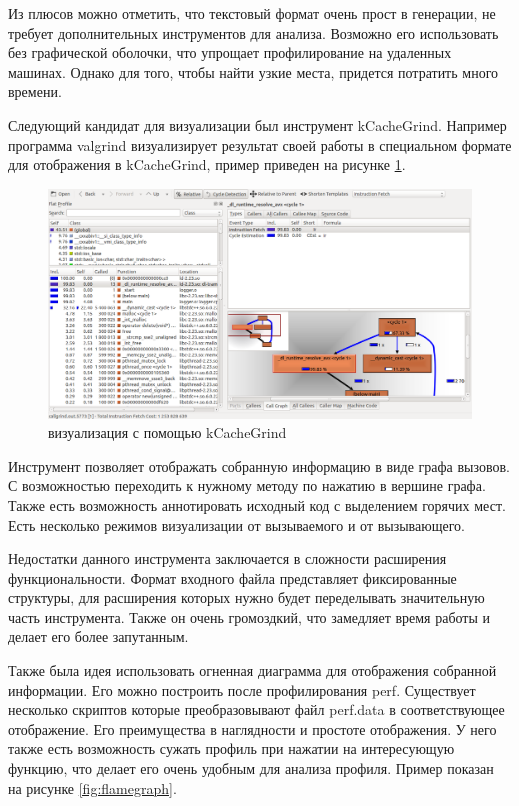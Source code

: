     Из плюсов можно отметить, что текстовый формат очень прост в генерации, не требует дополнительных инструментов для анализа. Возможно его использовать без графической оболочки, что упрощает профилирование на удаленных машинах. Однако для того, чтобы найти узкие места, придется потратить много времени.
    
    Следующий кандидат для визуализации был инструмент kCacheGrind. Например программа valgrind визуализирует результат своей работы в специальном формате для отображения в kCacheGrind, пример приведен на рисунке \ref{fig:kCacheGrind}.
    
    \begin{figure}[H]
        \caption{визуализация с помощью kCacheGrind}
        \label{fig:kCacheGrind}
        \centering
        \includegraphics[scale=0.3]{images/kCacheGrind}
    \end{figure}
    
    Инструмент позволяет отображать собранную информацию в виде графа вызовов. С возможностью переходить к нужному методу по нажатию в вершине графа. Также есть возможность аннотировать исходный код с выделением горячих мест. Есть несколько режимов визуализации от вызываемого и от вызывающего.
    
    Недостатки данного инструмента заключается в сложности расширения функциональности. Формат входного файла представляет фиксированные структуры, для расширения которых нужно будет переделывать значительную часть инструмента. Также он очень громоздкий, что замедляет время работы и делает его более запутанным.
    
    Также была идея использовать огненная диаграмма \cite{flamegraph} для отображения собранной информации. Его можно построить после профилирования perf. Существует несколько скриптов которые преобразовывают файл perf.data в соответствующее отображение. Его преимущества в наглядности и простоте отображения. У него также есть возможность сужать профиль при нажатии на интересующую функцию, что делает его очень удобным для анализа профиля. Пример показан на рисунке \ref{fig:flamegraph}.
    
